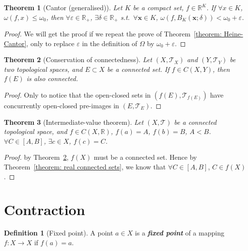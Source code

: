 \documentclass[openany]{book}
\newcommand*{\indexbf}[1]{\emph{\textbf{#1}}\index{#1}} %
\theoremstyle{plain}
\newtheorem{theorem}{Theorem}[section] %
\theoremstyle{definition}
\newtheorem{definition}{Definition}[section] %
\newcommand*{\bv}{\boldsymbol} %
\begin{document}
\begin{theorem}[Cantor (generalised)]
	\label{theorem: generalised Cantor}
	Let $K$ be a compact set, $f \in \mathbb R^K$.
	If $\forall x \in K$, $\omega(f, x) \leq \omega_0$, then $\forall \varepsilon \in \mathbb R_+$, $\exists \delta \in \mathbb R_+$ s.t.\ $\forall \bv x \in K$, $\omega(f, B_K(\bv x; \delta)) < \omega_0 + \varepsilon$.
\end{theorem}
\begin{proof}
	We will get the proof if we repeat the prove of Theorem~\ref{theorem: Heine-Cantor}, only to replace $\varepsilon$ in the definition of $\varOmega$ by $\omega_0 + \varepsilon$.
\end{proof}

\begin{theorem}[Conservation of connectedness]\label{theorem: conservation of connectedness}
	Let $(X, \mathscr T_X)$ and $(Y, \mathscr T_Y)$ be two topological spaces, and $E \subset X$ be a connected set. 
	If $f \in C(X, Y)$, then $f(E)$ is also connected.
\end{theorem}
\begin{proof}
	Only to notice that the open-closed sets in $(f(E), \mathscr T_{ f(E)})$ have concurrently open-closed pre-images in $(E, \mathscr T_E)$.
\end{proof}

\begin{theorem}[Intermediate-value theorem]
	\label{theorem: intermediate-value}
	Let $(X, \mathscr T)$ be a connected topological space, and $f \in C(X, \mathbb R)$, $f(a) = A$, $f(b) = B$, $A < B$.
	$\forall C \in [A, B]$, $\exists c \in X$, $f(c) = C$.
\end{theorem}
\begin{proof}
	by Theorem~\ref{theorem: conservation of connectedness}, $f(X)$ must be a connected set. Hence by Theorem~\ref{theorem: real connected sets}, we know that $\forall C \in [A, B]$, $C \in f(X)$.
\end{proof}

\section{Contraction}

\begin{definition}[Fixed point]\label{definition: fixed point}
	A point $a\in X$ is a \indexbf{fixed point} of a mapping $f \colon X \to X$ if $f( a) = a$.
\end{definition}
\end{document}
